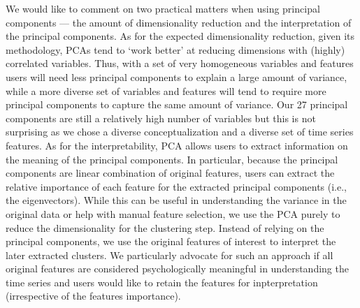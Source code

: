 We would like to comment on two practical matters when using principal
components --- the amount of dimensionality reduction and the
interpretation of the principal components. As for the expected
dimensionality reduction, given its methodology, PCAs tend to `work
better' at reducing dimensions with (highly) correlated variables. Thus,
with a set of very homogeneous variables and features users will need
less principal components to explain a large amount of variance, while a
more diverse set of variables and features will tend to require more
principal components to capture the same amount of variance. Our 27
principal components are still a relatively high number of variables but
this is not surprising as we chose a diverse conceptualization and a
diverse set of time series features. As for the interpretability, PCA
allows users to extract information on the meaning of the principal
components. In particular, because the principal components are linear
combination of original features, users can extract the relative
importance of each feature for the extracted principal components (i.e.,
the eigenvectors). While this can be useful in understanding the
variance in the original data or help with manual feature selection, we
use the PCA purely to reduce the dimensionality for the clustering step.
Instead of relying on the principal components, we use the original
features of interest to interpret the later extracted clusters. We
particularly advocate for such an approach if all original features are
considered psychologically meaningful in understanding the time series
and users would like to retain the features for inpterpretation
(irrespective of the features importance).
